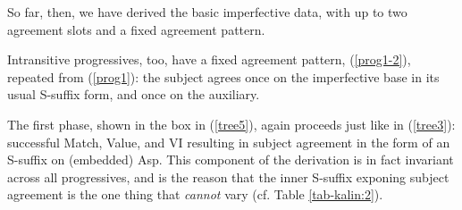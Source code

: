\documentclass[output=paper
,modfonts
,nonflat]{langsci/langscibook}
\begin{document}
\noindent So far, then, we have derived the basic imperfective data, with up to two agreement slots and a fixed agreement pattern. 

Intransitive progressives, too, have a fixed agreement pattern, (\ref{prog1-2}), repeated from (\ref{prog1}): the subject agrees once on the imperfective base in its usual S-suffix form, and once on the auxiliary. 

\z

\noindent The first phase, shown in the box in (\ref{tree5}), again proceeds just like in (\ref{tree3}): successful Match, Value, and VI resulting in subject agreement in the form of an S-suffix on (embedded) Asp. This component of the derivation is in fact invariant across all progressives, and is the reason that the inner S-suffix exponing subject agreement is the one thing that \textit{cannot} vary (cf. Table \ref{tab-kalin:2}). 
\end{document}
